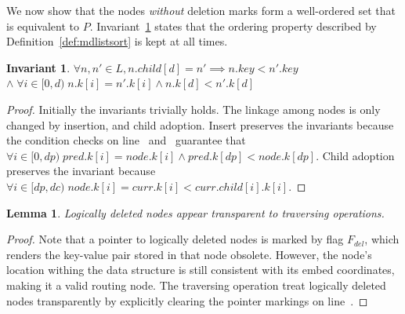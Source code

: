 \documentclass[10pt,conference,compsocconf]{IEEEtran}
\newtheorem{lemma}{Lemma}
\newtheorem{invariant}{Invariant}
\begin{document}
We now show that the nodes \emph{without} deletion marks form a well-ordered set that is equivalent to $P$.
Invariant~\ref{inv:order} states that the ordering property described by Definition~\ref{def:mdlistsort} is kept at all times.

\begin{invariant} \label{inv:order}
    $\forall n,n' \in L, n.child[d]=n' \implies n.key < n'.key$ $\land\;\forall i \in [0, d)\; n.k[i] = n'.k[i] \land n.k[d]<n'.k[d]$
\end{invariant}
\begin{proof}
    Initially the invariants trivially holds.
    The linkage among nodes is only changed by insertion, and child adoption.
    Insert preserves the invariants because the condition checks on line~ and~ guarantee that $\forall i \in [0, dp)\; pred.k[i] = node.k[i] \land pred.k[dp]<node.k[dp]$.
    Child adoption preserves the invariant because $\forall i \in [dp, dc)\; node.k[i] = curr.k[i] < curr.child[i].k[i]$.
\end{proof}

\begin{lemma} \label{lmm:logical}
    Logically deleted nodes appear transparent to traversing operations.
\end{lemma}
\begin{proof}
    Note that a pointer to logically deleted nodes is marked by flag $F_{del}$, which renders the key-value pair stored in that node obsolete.
    However, the node's location withing the data structure is still consistent with its embed coordinates, making it a valid routing node.
    The traversing operation treat logically deleted nodes transparently by explicitly clearing the pointer markings on line~. 
\end{proof}

\end{document}
